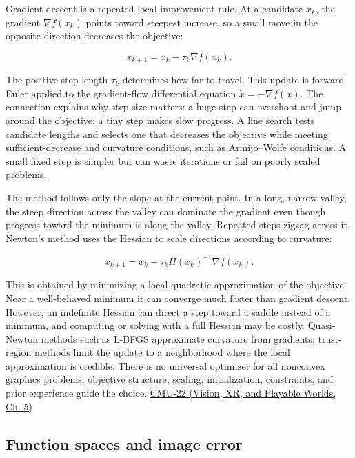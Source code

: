 Gradient descent is a repeated local improvement rule. At a candidate \(x_k\), the gradient \(\nabla f(x_k)\) points toward steepest increase, so a small move in the opposite direction decreases the objective:

\[
x_{k+1}=x_k-\tau_k\nabla f(x_k).
\]

The positive step length \(\tau_k\) determines how far to travel. This update is forward Euler applied to the gradient-flow differential equation \(\dot x=-\nabla f(x)\). The connection explains why step size matters: a huge step can overshoot and jump around the objective; a tiny step makes slow progress. A line search tests candidate lengths and selects one that decreases the objective while meeting sufficient-decrease and curvature conditions, such as Armijo--Wolfe conditions. A small fixed step is simpler but can waste iterations or fail on poorly scaled problems.

The method follows only the slope at the current point. In a long, narrow valley, the steep direction across the valley can dominate the gradient even though progress toward the minimum is along the valley. Repeated steps zigzag across it. Newton's method uses the Hessian to scale directions according to curvature:

\[
x_{k+1}=x_k-\tau_k H(x_k)^{-1}\nabla f(x_k).
\]

This is obtained by minimizing a local quadratic approximation of the objective. Near a well-behaved minimum it can converge much faster than gradient descent. However, an indefinite Hessian can direct a step toward a saddle instead of a minimum, and computing or solving with a full Hessian may be costly. Quasi-Newton methods such as L-BFGS approximate curvature from gradients; trust-region methods limit the update to a neighborhood where the local approximation is credible. There is no universal optimizer for all nonconvex graphics problems; objective structure, scaling, initialization, constraints, and prior experience guide the choice. \href{../07-Vision-XR-and-Playable-Worlds/main.pdf\#nameddest=04-visual-computing-ii-ch036-cmu-22---optimization}{CMU-22 (Vision, XR, and Playable Worlds, Ch. 5)}

\subsection{Function spaces and image error}\label{04-visual-computing-ii-ch029-function-spaces-and-image-error}

\hypertarget{04-visual-computing-ii-ch029-function-spaces-and-image-error}{}

